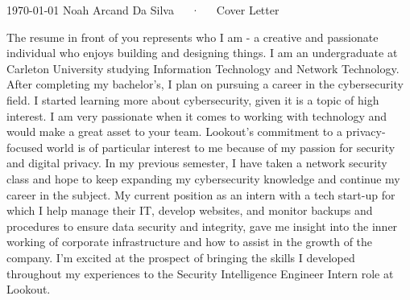 \documentclass[11pt, a4paper]{awesome-cv}
\begin{document}
\makecvheader[R]

\makecvfooter
  {\today}
  {Noah Arcand Da Silva~~~·~~~Cover Letter}
  {}

\makelettertitle


\begin{cvletter}

The resume in front of you represents who I am - a creative and passionate individual who enjoys building and designing things.  I am an undergraduate at Carleton University studying Information Technology and Network Technology. After completing my bachelor's, I plan on pursuing a career in the cybersecurity field. I started learning more about cybersecurity, given it is a topic of high interest. I am very passionate when it comes to working with technology and would make a great asset to your team.
Lookout's commitment to a privacy-focused world is of particular interest to me because of my passion for security and digital privacy. In my previous semester, I have taken a network security class and hope to keep expanding my cybersecurity knowledge and continue my career in the subject.
My current position as an intern with a tech start-up for which I help manage their IT, develop websites, and monitor backups and procedures to ensure data security and integrity, gave me insight into the inner working of corporate infrastructure and how to assist in the growth of the company. I'm excited at the prospect of bringing the skills I developed throughout my experiences to the Security Intelligence Engineer Intern role at Lookout.

\end{cvletter}


\makeletterclosing
\end{document}
